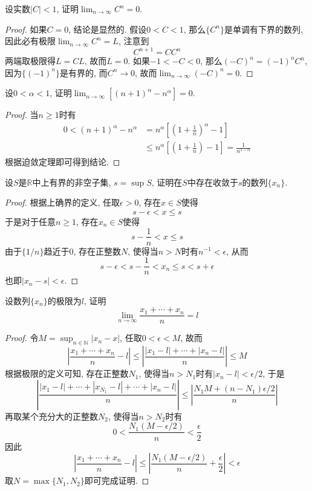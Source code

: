 \documentclass[cn,12pt,math=mtpro2,citestyle=gb7714-2015,bibstyle=gb7714-2015,twocol]{elegantbook}
\newcommand{\R}{\mathbb{R}}
\newcommand{\limn}{\lim_{n\to\infty}}
\begin{document}
\begin{example}
设实数$|C|<1$, 证明$\limn C^n=0$.
\end{example}
\begin{proof}
  如果$C=0$, 结论是显然的. 假设$0<C<1$, 那么$\{C^n\}$是单调有下界的数列, 因此必有极限$\limn C^n=L$, 注意到
  $$C^{n+1}=CC^n$$
  两端取极限得$L=CL$, 故而$L=0$. 如果$-1<-C<0$, 那么$(-C)^n=(-1)^nC^n$, 因为$\{(-1)^n\}$是有界的, 而$C^n\to0$, 故而$\limn (-C)^n=0$.
\end{proof}

\begin{example}
设$0<\alpha<1$, 证明$\limn [(n+1)^\alpha-n^\alpha]=0$.
\end{example}
\begin{proof}
  当$n\ge1$时有
  \begin{align*}
  0<(n+1)^\alpha-n^\alpha&=n^\alpha\left[\left(1+\frac{1}{n}\right)^\alpha-1\right] \\
  &\leq n^\alpha\left[\left(1+\frac{1}{n}\right)-1\right]=\frac{1}{n^{1-\alpha}}
  \end{align*}
  根据迫敛定理即可得到结论.
\end{proof}

\begin{example}
设$S$是$\R$中上有界的非空子集, $s=\sup S$, 证明在$S$中存在收敛于$s$的数列$\{x_n\}$.
\end{example}
\begin{proof}
  根据上确界的定义, 任取$\epsilon>0$, 存在$x\in S$使得
  $$s-\epsilon<x\leq s$$
  于是对于任意$n\ge1$, 存在$x_n\in S$使得
  $$s-\frac{1}{n}<x\leq s$$
  由于$\{1/n\}$趋近于0, 存在正整数$N$, 使得当$n>N$时有$n^{-1}<\epsilon$, 从而
  $$s-\epsilon<s-\frac{1}{n}<x_n\leq s<s+\epsilon$$
  也即$|x_n-s|<\epsilon$.
\end{proof}

\begin{example}[$\,$Cesaro均值]
设数列$\{x_n\}$的极限为$l$, 证明
$$\limn \frac{x_1+\cdots+x_n}{n}=l$$
\end{example}
\begin{proof}
  令$M=\sup_{n\in\mathbb{N}}|x_n-x|$, 任取$0<\epsilon<M$, 故而
  $$\left|\frac{x_1+\cdots+x_n}{n}-l\right|\leq \left|\frac{|x_1-l|+\cdots+|x_n-l|}{n}\right|\leq M$$
  根据极限的定义可知, 存在正整数$N_1$, 使得当$n>N_1$时有$|x_n-l|<\epsilon/2$, 于是
  $$\left|\frac{|x_1-l|+\cdots+|x_{N_1}-l|+\cdots+|x_n-l|}{n}\right|\leq \left|\frac{N_1M+(n-N_1)\epsilon/2}{n}\right|$$
  再取某个充分大的正整数$N_2$, 使得当$n>N_2$时有
  $$0<\frac{N_1(M-\epsilon/2)}{n}<\frac{\epsilon}{2}$$
  因此
  $$\left|\frac{x_1+\cdots+x_n}{n}-l\right|\leq \left|\frac{N_1(M-\epsilon/2)}{n}+\frac{\epsilon}{2}\right|<\epsilon$$
  取$N=\max\{N_1,N_2\}$即可完成证明.
\end{proof}
\end{document}
